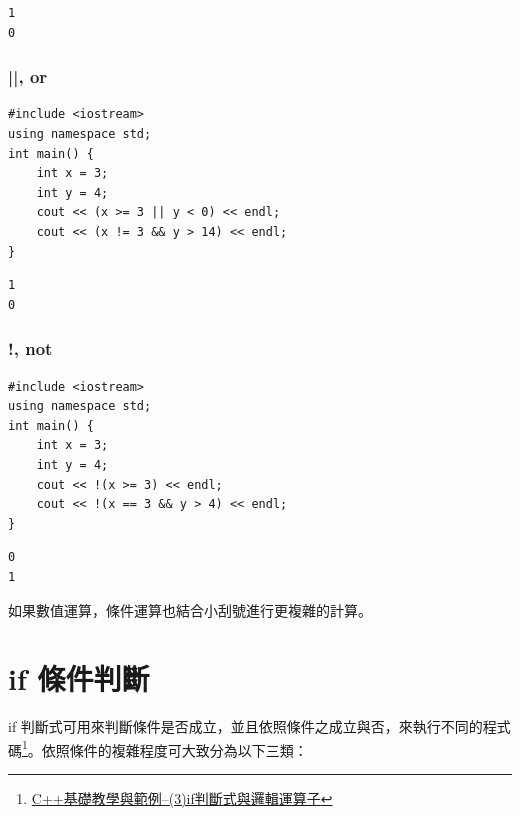 \documentclass[12pt,a4paper]{article}
\begin{document}
\begin{verbatim}
1
0
\end{verbatim}

\subsubsection{||, or}
\label{sec:org71f3cbf}
\lstset{breaklines=true,language=cpp,label= ,caption= ,captionpos=b,firstnumber=1,numbers=left}
\begin{lstlisting}
#include <iostream>
using namespace std;
int main() {
    int x = 3;
    int y = 4;
    cout << (x >= 3 || y < 0) << endl;
    cout << (x != 3 && y > 14) << endl;
}
\end{lstlisting}

\begin{verbatim}
1
0
\end{verbatim}

\subsubsection{!, not}
\label{sec:org64de5ba}
\lstset{breaklines=true,language=cpp,label= ,caption= ,captionpos=b,firstnumber=1,numbers=left}
\begin{lstlisting}
#include <iostream>
using namespace std;
int main() {
    int x = 3;
    int y = 4;
    cout << !(x >= 3) << endl;
    cout << !(x == 3 && y > 4) << endl;
}
\end{lstlisting}

\begin{verbatim}
0
1
\end{verbatim}


如果數值運算，條件運算也結合小刮號進行更複雜的計算。

\section{if 條件判斷}
\label{cpp_ifelse}
if 判斷式可用來判斷條件是否成立，並且依照條件之成立與否，來執行不同的程式碼\footnote{\href{https://crmne0707.pixnet.net/blog/post/285395384-c\%2B\%2B\%E5\%9F\%BA\%E7\%A4\%8E\%E6\%95\%99\%E5\%AD\%B8\%E8\%88\%87\%E7\%AF\%84\%E4\%BE\%8B--https://crmne0707.pixnet.net/blog/post/285395384-c\%2B\%2B\%E5\%9F\%BA\%E7\%A4\%8E\%E6\%95\%99\%E5\%AD\%B8\%E8\%88\%87\%E7\%AF\%84\%E4\%BE\%8B--\%283\%29if\%E5\%88\%A4\%E6\%96\%B7\%E5\%BC\%8F\%E8\%88\%87\%E9\%82\%8F\%E8\%BC\%AF\%E9\%81\%8B\%E7\%AE\%97\%E5\%AD\%90}{C++基礎教學與範例--(3)if判斷式與邏輯運算子}}。依照條件的複雜程度可大致分為以下三類：
\end{document}
